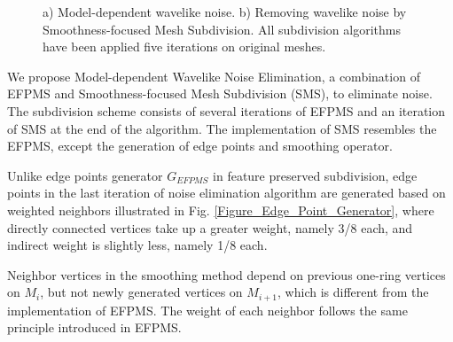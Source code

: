 \documentclass[10pt, conference, compsocconf]{IEEEtran}
\begin{document}
\begin{figure}[htbp]
  \caption{a) Model-dependent wavelike noise. b) Removing wavelike noise by Smoothness-focused Mesh Subdivision. All subdivision algorithms have been applied five iterations on original meshes.}\label{Figure_Noise}
\end{figure}


We propose Model-dependent Wavelike Noise Elimination, a combination of EFPMS and Smoothness-focused Mesh Subdivision (SMS), to eliminate noise. The subdivision scheme consists of several iterations of EFPMS and an iteration of SMS at the end of the algorithm. %
The implementation of SMS resembles the EFPMS, except the generation of edge points and smoothing operator.

Unlike edge points generator $G_{EFPMS}$ in feature preserved subdivision, edge points in the last iteration of noise elimination algorithm are generated based on weighted neighbors illustrated in Fig. \ref{Figure_Edge_Point_Generator}, where directly connected vertices take up a greater weight, namely 3/8 each, and indirect weight is slightly less, namely 1/8 each.

Neighbor vertices in the smoothing method depend on previous one-ring vertices on $M_i$, but not newly generated vertices on $M_{i+1}$, which is different from the implementation of EFPMS. The weight of each neighbor follows the same principle introduced in EFPMS.

\end{document}
